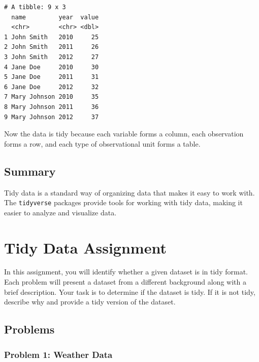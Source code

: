 \documentclass[
  letterpaper,
  DIV=11,
  numbers=noendperiod]{scrreprt}
\begin{document}
\begin{verbatim}
# A tibble: 9 x 3
  name         year  value
  <chr>        <chr> <dbl>
1 John Smith   2010     25
2 John Smith   2011     26
3 John Smith   2012     27
4 Jane Doe     2010     30
5 Jane Doe     2011     31
6 Jane Doe     2012     32
7 Mary Johnson 2010     35
8 Mary Johnson 2011     36
9 Mary Johnson 2012     37
\end{verbatim}

Now the data is tidy because each variable forms a column, each
observation forms a row, and each type of observational unit forms a
table.

\section*{Summary}\label{summary}


Tidy data is a standard way of organizing data that makes it easy to
work with. The \texttt{tidyverse} packages provide tools for working
with tidy data, making it easier to analyze and visualize data.


\chapter*{Tidy Data Assignment}\label{tidy-data-assignment}


In this assignment, you will identify whether a given dataset is in tidy
format. Each problem will present a dataset from a different background
along with a brief description. Your task is to determine if the dataset
is tidy. If it is not tidy, describe why and provide a tidy version of
the dataset.

\section*{Problems}\label{problems}


\subsection*{Problem 1: Weather Data}\label{problem-1-weather-data}
\end{document}
